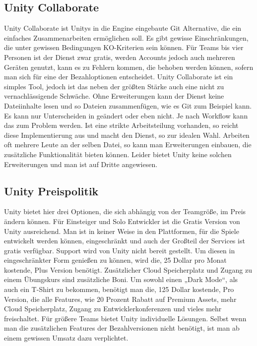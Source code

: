 \subsection{Unity Collaborate}
Unity Collaborate ist Unitys in die Engine eingebaute Git Alternative, die ein einfaches Zusammenarbeiten ermöglichen soll. Es gibt gewisse Einschränkungen, die unter gewissen Bedingungen KO-Kriterien sein können. Für Teams bis vier Personen ist der Dienst zwar gratis, werden Accounts jedoch auch mehreren Geräten genutzt, kann es zu Fehlern kommen, die behoben werden können, sofern man sich für eine der Bezahloptionen entscheidet. Unity Collaborate ist ein simples Tool, jedoch ist das neben der größten Stärke auch eine nicht zu vernachlässigende Schwäche. Ohne Erweiterungen kann der Dienst keine Dateiinhalte lesen und so Dateien zusammenfügen, wie es Git zum Beispiel kann. Es kann nur Unterscheiden in geändert oder eben nicht. Je nach Workflow kann das zum Problem werden. Ist eine strikte Arbeitsteilung vorhanden, so reicht diese Implementierung aus und macht den Dienst, so zur idealen Wahl. Arbeiten oft mehrere Leute an der selben Datei, so kann man Erweiterungen einbauen, die zusätzliche Funktionalität bieten können. Leider bietet Unity keine solchen Erweiterungen und man ist auf Dritte angewiesen.

\subsection{Unity Preispolitik \cite{noauthor_unityprice_nodate}}
Unity bietet hier drei Optionen, die sich abhängig von der Teamgröße, im Preis ändern können. Für Einsteiger und Solo Entwickler ist die Gratis Version von Unity ausreichend. Man ist in keiner Weise in den Plattformen, für die Spiele entwickelt werden können, eingeschränkt und auch der Großteil der Services ist gratis verfügbar. Support wird von Unity nicht bereit gestellt. Um diesen in eingeschränkter Form genießen zu können, wird die, 25 Dollar pro Monat kostende, Plus Version benötigt. Zusätzlicher Cloud Speicherplatz und Zugang zu einem Übungskurs sind zusätzliche Boni. Um sowohl einen „Dark Mode“, als auch ein T-Shirt zu bekommen, benötigt man die, 125 Dollar kostende, Pro Version, die alle Features, wie 20 Prozent Rabatt auf Premium Assets, mehr Cloud Speicherplatz, Zugang zu Entwicklerkonferenzen und vieles mehr freischaltet. Für größere Teams bietet Unity individuelle Lösungen. Selbst wenn man die zusätzlichen Features der Bezahlversionen nicht benötigt, ist man ab einem gewissen Umsatz dazu verplichtet.

